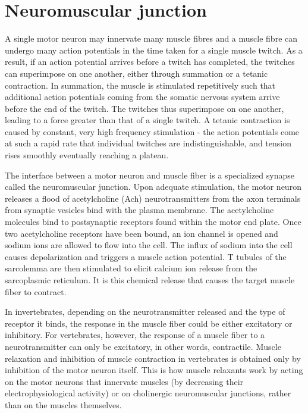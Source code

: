 \hypertarget{neuromuscular-junction}{%
\section{Neuromuscular junction}\label{neuromuscular-junction}}

A single motor neuron may innervate many muscle fibres and a muscle fibre can undergo many action potentials in the time taken for a single muscle twitch. As a result, if an action potential arrives before a twitch has completed, the twitches can superimpose on one another, either through summation or a tetanic contraction. In summation, the muscle is stimulated repetitively such that additional action potentials coming from the somatic nervous system arrive before the end of the twitch. The twitches thus superimpose on one another, leading to a force greater than that of a single twitch. A tetanic contraction is caused by constant, very high frequency stimulation - the action potentials come at such a rapid rate that individual twitches are indistinguishable, and tension rises smoothly eventually reaching a plateau.

The interface between a motor neuron and muscle fiber is a specialized synapse called the neuromuscular junction. Upon adequate stimulation, the motor neuron releases a flood of acetylcholine (Ach) neurotransmitters from the axon terminals from synaptic vesicles bind with the plasma membrane. The acetylcholine molecules bind to postsynaptic receptors found within the motor end plate. Once two acetylcholine receptors have been bound, an ion channel is opened and sodium ions are allowed to flow into the cell. The influx of sodium into the cell causes depolarization and triggers a muscle action potential. T tubules of the sarcolemma are then stimulated to elicit calcium ion release from the sarcoplasmic reticulum. It is this chemical release that causes the target muscle fiber to contract.

In invertebrates, depending on the neurotransmitter released and the type of receptor it binds, the response in the muscle fiber could be either excitatory or inhibitory. For vertebrates, however, the response of a muscle fiber to a neurotransmitter can only be excitatory, in other words, contractile. Muscle relaxation and inhibition of muscle contraction in vertebrates is obtained only by inhibition of the motor neuron itself. This is how muscle relaxants work by acting on the motor neurons that innervate muscles (by decreasing their electrophysiological activity) or on cholinergic neuromuscular junctions, rather than on the muscles themselves.


